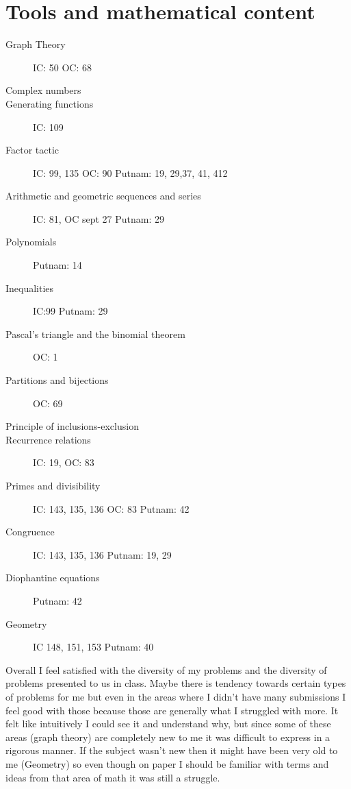 \documentclass[11pt]{article}
\begin{document}
\section{Tools and mathematical content}
\begin{description}
    \item[Graph Theory] IC: 50 OC: 68
    \item[Complex numbers]
    \item[Generating functions] IC: 109
    \item[Factor tactic]IC: 99, 135 OC: 90 Putnam: 19, 29,37, 41, 412 
    \item[Arithmetic and geometric sequences and series] IC: 81, OC sept 27 Putnam: 29
    \item[Polynomials] Putnam: 14
    \item[Inequalities] IC:99 Putnam: 29
    \item[Pascal's triangle and the binomial theorem] OC: 1
    \item[Partitions and bijections] OC: 69
    \item[Principle of inclusions-exclusion]
    \item[Recurrence relations] IC: 19, OC: 83
    \item[Primes and divisibility] IC: 143, 135, 136 OC: 83 Putnam: 42
    \item[Congruence] IC: 143, 135, 136 Putnam: 19, 29
    \item[Diophantine equations] Putnam: 42
    \item[Geometry] IC 148, 151, 153 Putnam: 40         
\end{description}

Overall I feel satisfied with the diversity of my problems and the diversity of problems presented to us in class. Maybe there is tendency towards certain types of problems for me but even in the areas where I didn't have many submissions I feel good with those because those are generally what I struggled with more. It felt like intuitively I could see it and understand why, but since some of these areas (graph theory) are completely new to me it was difficult to express in a rigorous manner. If the subject wasn't new then it might have been very old to me (Geometry) so even though on paper I should be familiar with terms and ideas from that area of math it was still a struggle.  
\end{document}
